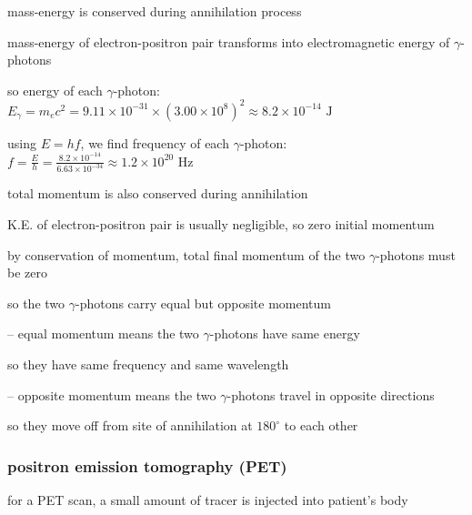 \cmt mass-energy is conserved during annihilation process

mass-energy of electron-positron pair transforms into electromagnetic energy of $\gamma$-photons

so energy of each $\gamma$-photon: $E_\gamma = m_e c^2 = 9.11\times10^{-31} \times (3.00 \times 10^8)^2 \approx 8.2 \times 10^{-14} \text{ J}$

using $E=hf$, we find frequency of each $\gamma$-photon: $f = \frac{E}{h} = \frac{8.2 \times 10^{-14}}{6.63\times10^{-34}} \approx 1.2 \times 10^{20} \text{ Hz}$

\cmt total momentum is also conserved during annihilation

K.E. of electron-positron pair is usually negligible, so zero initial momentum

by conservation of momentum, total final momentum of the two $\gamma$-photons must be zero

so the two $\gamma$-photons carry equal but opposite momentum

\begin{compactitem}
	\item[--] equal momentum means the two $\gamma$-photons have same energy
	
	so they have same frequency and same wavelength
	
	\item[--] opposite momentum means the two $\gamma$-photons travel in opposite directions
	
	so they move off from site of annihilation at $180^\circ$ to each other
	
\end{compactitem}





\subsubsection{positron emission tomography (PET)}

for a PET scan, a small amount of tracer is injected into patient's body 

